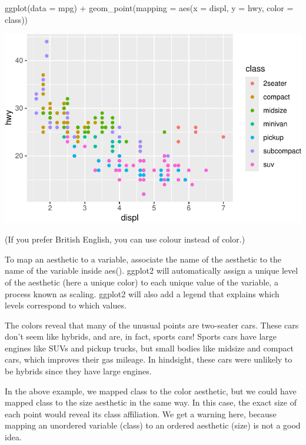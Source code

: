 \documentclass[
  letterpaper,
  DIV=11,
  numbers=noendperiod]{scrreprt}
\newenvironment{Shaded}{\begin{snugshade}}{\end{snugshade}}
\newcommand{\AttributeTok}[1]{\textcolor[rgb]{0.40,0.45,0.13}{#1}}
\newcommand{\FunctionTok}[1]{\textcolor[rgb]{0.28,0.35,0.67}{#1}}
\newcommand{\NormalTok}[1]{\textcolor[rgb]{0.00,0.23,0.31}{#1}}
\newcommand{\SpecialCharTok}[1]{\textcolor[rgb]{0.37,0.37,0.37}{#1}}
\begin{document}
\begin{Shaded}
\begin{Highlighting}[]
\FunctionTok{ggplot}\NormalTok{(}\AttributeTok{data =}\NormalTok{ mpg) }\SpecialCharTok{+}
  \FunctionTok{geom\_point}\NormalTok{(}\AttributeTok{mapping =} \FunctionTok{aes}\NormalTok{(}\AttributeTok{x =}\NormalTok{ displ, }\AttributeTok{y =}\NormalTok{ hwy, }\AttributeTok{color =}\NormalTok{ class))}
\end{Highlighting}
\end{Shaded}

\includegraphics{Beginning_Data_Visualization_files/figure-pdf/Example-1.pdf}

(If you prefer British English, you can use colour instead of color.)

To map an aesthetic to a variable, associate the name of the aesthetic
to the name of the variable inside aes(). ggplot2 will automatically
assign a unique level of the aesthetic (here a unique color) to each
unique value of the variable, a process known as scaling. ggplot2 will
also add a legend that explains which levels correspond to which values.

The colors reveal that many of the unusual points are two-seater cars.
These cars don't seem like hybrids, and are, in fact, sports cars!
Sports cars have large engines like SUVs and pickup trucks, but small
bodies like midsize and compact cars, which improves their gas mileage.
In hindsight, these cars were unlikely to be hybrids since they have
large engines.

In the above example, we mapped class to the color aesthetic, but we
could have mapped class to the size aesthetic in the same way. In this
case, the exact size of each point would reveal its class affiliation.
We get a warning here, because mapping an unordered variable (class) to
an ordered aesthetic (size) is not a good idea.
\end{document}
